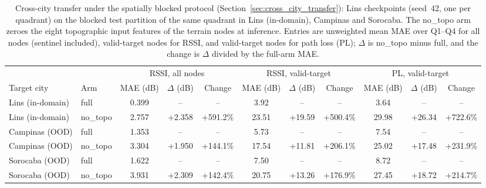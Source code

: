 \begin{table}[t]
\caption{Cross-city transfer under the spatially blocked protocol (Section~\ref{sec:cross_city_transfer}): Lins checkpoints (seed~42, one per quadrant) on the blocked test partition of the same quadrant in Lins (in-domain), Campinas and Sorocaba. The no\_topo arm zeroes the eight topographic input features of the terrain nodes at inference. Entries are unweighted mean MAE over Q1--Q4 for all nodes (sentinel included), valid-target nodes for RSSI, and valid-target nodes for path loss (PL); $\Delta$ is no\_topo minus full, and the change is $\Delta$ divided by the full-arm MAE.}
\label{tab:ood_blocked}
\centering
\small
\setlength{\tabcolsep}{4pt}
\begin{tabular}{ll ccc ccc ccc}
\toprule
 & & \multicolumn{3}{c}{RSSI, all nodes} & \multicolumn{3}{c}{RSSI, valid-target} & \multicolumn{3}{c}{PL, valid-target} \\
\cmidrule(lr){3-5}\cmidrule(lr){6-8}\cmidrule(lr){9-11}
Target city & Arm & MAE (dB) & $\Delta$ (dB) & Change & MAE (dB) & $\Delta$ (dB) & Change & MAE (dB) & $\Delta$ (dB) & Change \\
\midrule
Lins (in-domain) & full & 0.399 & -- & -- & 3.92 & -- & -- & 3.64 & -- & -- \\
Lins (in-domain) & no\_topo & 2.757 & +2.358 & +591.2\% & 23.51 & +19.59 & +500.4\% & 29.98 & +26.34 & +722.6\% \\
\midrule
Campinas (OOD) & full & 1.353 & -- & -- & 5.73 & -- & -- & 7.54 & -- & -- \\
Campinas (OOD) & no\_topo & 3.304 & +1.950 & +144.1\% & 17.54 & +11.81 & +206.1\% & 25.02 & +17.48 & +231.9\% \\
\midrule
Sorocaba (OOD) & full & 1.622 & -- & -- & 7.50 & -- & -- & 8.72 & -- & -- \\
Sorocaba (OOD) & no\_topo & 3.931 & +2.309 & +142.4\% & 20.75 & +13.26 & +176.9\% & 27.45 & +18.72 & +214.7\% \\
\bottomrule
\end{tabular}
\end{table}
